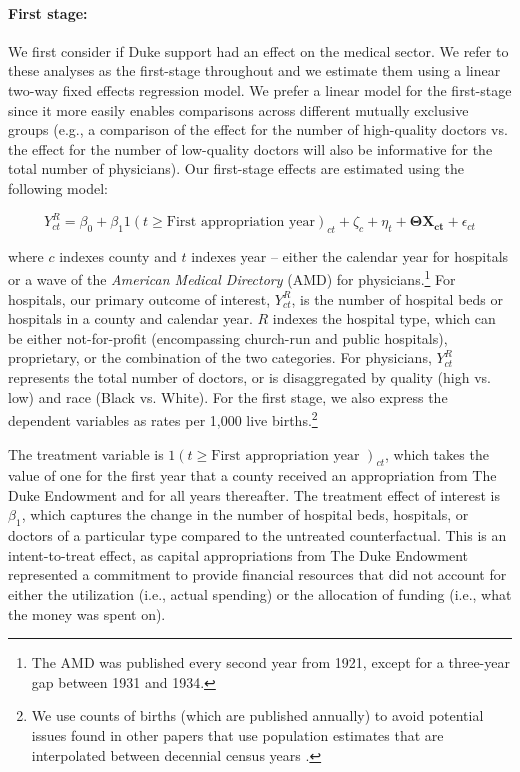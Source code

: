 \documentclass[12pt]{article}
\begin{document}
\noindent \paragraph{First stage:} We first consider if Duke support had an effect on the medical sector. 
 We refer to these analyses as the first-stage throughout and we estimate them using a linear two-way fixed effects regression model. 
 We prefer a linear model for the first-stage since it more easily enables comparisons across different mutually exclusive groups (e.g., a comparison of the effect for the number of high-quality doctors vs. the effect for the number of low-quality doctors will also be informative for the total number of physicians). 
 Our first-stage effects are estimated using the following model: 

\vspace{-.25cm}
\begin{footnotesize}
\begin{singlespace}
\begin{equation}
    Y^{R}_{ct} = \beta_0 + \beta_1{1(t \geq \text{First appropriation year})_{ct}} + \zeta_c + \eta_t + \boldsymbol{\Theta} \mathbf{X_{ct}} + \epsilon_{ct} \label{eq:first-stage}
\end{equation}
\end{singlespace}
\end{footnotesize}

\noindent where $c$ indexes county and $t$ indexes year -- either the calendar year for hospitals or a wave of the \emph{American Medical Directory} (AMD) for physicians.\footnote{The AMD was published every second year from 1921, except for a three-year gap between 1931 and 1934.} For hospitals, our primary outcome of interest, $Y^{R}_{ct}$, is the number of hospital beds or hospitals in a county and calendar year. $R$ indexes the hospital type, which can be either not-for-profit (encompassing church-run and public hospitals), proprietary, or the combination of the two categories. For physicians, $Y^{R}_{ct}$ represents the total number of doctors, or is disaggregated  by quality (high vs. low) and race (Black vs. White). For the first stage, we also express the dependent variables as rates per 1,000 live births.\footnote{We use counts of births (which are published annually) to avoid potential issues found in other papers that use population estimates that are interpolated between decennial census years .} 

The treatment variable is $1(t \geq \text{First appropriation year })_{ct}$, which takes the value of one for the first year that a county received an appropriation from The Duke Endowment and for all years thereafter.
The treatment effect of interest is $\beta_1$, which captures the change in the number of hospital beds, hospitals, or doctors of a particular type compared to the untreated counterfactual. 
This is an intent-to-treat effect, as capital appropriations from The Duke Endowment represented a commitment to provide financial resources that did not account for either the utilization (i.e., actual spending) or the allocation of funding (i.e., what the money was spent on).
\end{document}
